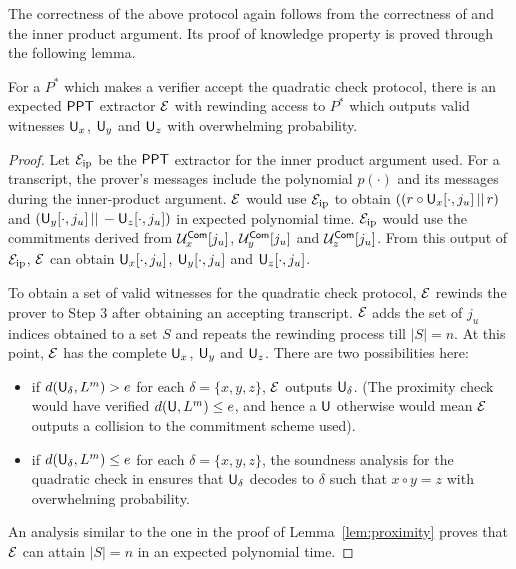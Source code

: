 The correctness of the above protocol again follows from the correctness of \cite{ligero} and the inner product argument. Its proof of knowledge property is proved through the following lemma.
\begin{lemma}
For a $P^*$ which makes a verifier accept the quadratic check protocol, there is an expected $\mathsf{PPT}$ extractor $\mathcal{E}$ with rewinding access to $P^*$ which outputs valid witnesses $\mathsf{U}_x$, $\mathsf{U}_y$ and $\mathsf{U}_z$ with overwhelming probability.
\end{lemma}
\begin{proof}
Let $\mathcal{E}_{\mathrm{ip}}$ be the $\mathsf{PPT}$ extractor for the inner product argument used. For a transcript, the prover's messages include the polynomial $p(\cdot)$ and its messages during the inner-product argument.
$\mathcal{E}$ would use $\mathcal{E}_{\mathrm{ip}}$ to obtain $\left( (r \circ \mathsf{U}_x[\cdot,j_u] \, || \, r \right)$ and $\left( \mathsf{U}_y[\cdot,j_u] \, || \, -\mathsf{U}_z[\cdot,j_u] \right)$ in expected polynomial time. $\mathcal{E}_{\mathrm{ip}}$ would use the commitments derived from $\mathcal{U}^{\mathsf{Com}}_x[j_u]$, $\mathcal{U}^{\mathsf{Com}}_y[j_u]$ and $\mathcal{U}^{\mathsf{Com}}_z[j_u]$. From this output of $\mathcal{E}_{\mathrm{ip}}$, $\mathcal{E}$ can obtain $\mathsf{U}_x[\cdot,j_u]$, $\mathsf{U}_y[\cdot,j_u]$ and $\mathsf{U}_z[\cdot,j_u]$.

To obtain a set of valid witnesses for the quadratic check protocol, $\mathcal{E}$ rewinds the prover to Step 3 after obtaining an accepting transcript. $\mathcal{E}$ adds the set of $j_u$ indices obtained to a set $S$ and repeats the rewinding process till $|S| = n$. At this point, $\mathcal{E}$ has the complete $\mathsf{U}_x$, $\mathsf{U}_y$ and $\mathsf{U}_z$. There are two possibilities here:
\begin{itemize}
\item if $d(\mathsf{U}_\delta,L^m) > e$ for each $\delta = \{x, y, z\}$, $\mathcal{E}$ outputs $\mathsf{U}_\delta$. (The proximity check would have verified $d(\mathsf{U},L^m) \leq e$, and hence a $\mathsf{U}$ otherwise would mean $\mathcal{E}$ outputs a collision to the commitment scheme used).
\item if $d(\mathsf{U}_\delta,L^m) \leq e$ for each $\delta = \{x, y, z\}$, the soundness analysis for the quadratic check in \cite{ligero} ensures that $\mathsf{U}_\delta$ decodes to $\delta$ such that $x\circ y = z$ with overwhelming probability.
\end{itemize}
An analysis similar to the one in the proof of Lemma~\ref{lem:proximity} proves that $\mathcal{E}$ can attain $|S| = n$ in an expected polynomial time.
\end{proof}
